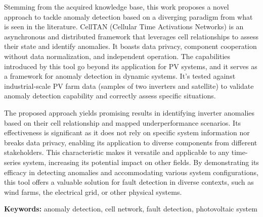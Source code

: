 Stemming from the acquired knowledge base, this work proposes a novel approach to tackle anomaly detection based on a diverging paradigm from what is seen in the literature. CellTAN (Cellular Time Activations Networks) is an asynchronous and distributed framework that leverages cell relationships to assess their state and identify anomalies. It boasts data privacy, component cooperation without data normalization, and independent operation. The capabilities introduced by this tool go beyond its application for PV systems, and it serves as a framework for anomaly detection in dynamic systems. It's tested against industrial-scale PV farm data (samples of two inverters and satellite) to validate anomaly detection capability and correctly assess specific situations.

The proposed approach yields promising results in identifying inverter anomalies based on their cell relationship and mapped underperformance scenarios. Its effectiveness is significant as it does not rely on specific system information nor breaks data privacy, enabling its application to diverse components from different stakeholders. This characteristic makes it versatile and applicable to any time-series system, increasing its potential impact on other fields. By demonstrating its efficacy in detecting anomalies and accommodating various system configurations, this tool offers a valuable solution for fault detection in diverse contexts, such as wind farms, the electrical grid, or other physical systems.


\bigskip

\textbf{Keywords:} anomaly detection, cell network, fault detection, photovoltaic system
